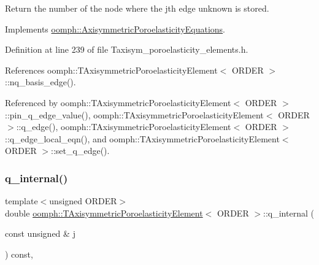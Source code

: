 Return the number of the node where the jth edge unknown is stored. 



Implements \hyperlink{classoomph_1_1AxisymmetricPoroelasticityEquations_a3067ec7af1ffb4656b63f5921a9a6467}{oomph\+::\+Axisymmetric\+Poroelasticity\+Equations}.



Definition at line 239 of file Taxisym\+\_\+poroelasticity\+\_\+elements.\+h.



References oomph\+::\+T\+Axisymmetric\+Poroelasticity\+Element$<$ O\+R\+D\+E\+R $>$\+::nq\+\_\+basis\+\_\+edge().



Referenced by oomph\+::\+T\+Axisymmetric\+Poroelasticity\+Element$<$ O\+R\+D\+E\+R $>$\+::pin\+\_\+q\+\_\+edge\+\_\+value(), oomph\+::\+T\+Axisymmetric\+Poroelasticity\+Element$<$ O\+R\+D\+E\+R $>$\+::q\+\_\+edge(), oomph\+::\+T\+Axisymmetric\+Poroelasticity\+Element$<$ O\+R\+D\+E\+R $>$\+::q\+\_\+edge\+\_\+local\+\_\+eqn(), and oomph\+::\+T\+Axisymmetric\+Poroelasticity\+Element$<$ O\+R\+D\+E\+R $>$\+::set\+\_\+q\+\_\+edge().

\mbox{\label{classoomph_1_1TAxisymmetricPoroelasticityElement_af21c0187d947dc5a59278a3dd5b2397f}} 
\subsubsection{\texorpdfstring{q\+\_\+internal()}{q\_internal()}\hspace{0.1cm}{\footnotesize\ttfamily [1/2]}}
{\footnotesize\ttfamily template$<$unsigned O\+R\+D\+ER$>$ \\
double \hyperlink{classoomph_1_1TAxisymmetricPoroelasticityElement}{oomph\+::\+T\+Axisymmetric\+Poroelasticity\+Element}$<$ O\+R\+D\+ER $>$\+::q\+\_\+internal (\begin{DoxyParamCaption}\item[{const unsigned \&}]{j }\end{DoxyParamCaption}) const\hspace{0.3cm}{\ttfamily [inline]}, {\ttfamily [virtual]}}



